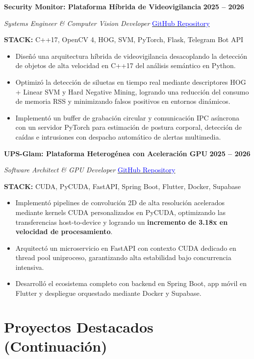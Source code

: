 \documentclass[10pt,a4paper]{article}
\newenvironment{project}[5]{
    \begin{tcolorbox}[
        enhanced,
        colback=cardbg,
        colframe=linecolor,
        boxrule=0.5pt,
        arc=2mm,
        left=3mm,
        right=3mm,
        top=2.5mm,
        bottom=2mm,
        before skip=5pt,
        after skip=5pt,
        breakable
    ]

    {\normalsize\bfseries\color{navy} #1}
    \hfill
    {\small\bfseries\color{blue} #3}

    \vspace{1pt}

    {\small\itshape\color{darktext} #2}
    \hfill
    {\small #4}

    \vspace{3pt}

    {\footnotesize\color{muted}\textbf{STACK:} #5}

    \vspace{2pt}
    \small
    \begin{itemize}
}{
    \end{itemize}
    \end{tcolorbox}
}
\begin{document}
\begin{project}
{Security Monitor: Plataforma Híbrida de Videovigilancia}
{Systems Engineer \& Computer Vision Developer}
{2025 -- 2026}
{\href{https://github.com/David5Uzhca/Security_Monitor_Based_on_Computer_Vision}
{\textcolor{blue}{GitHub Repository}}}
{C++17, OpenCV 4, HOG, SVM, PyTorch, Flask, Telegram Bot API}
    \item Diseñó una arquitectura híbrida de videovigilancia desacoplando la detección de objetos de alta velocidad en C++17 del análisis semántico en Python.
    \item Optimizó la detección de siluetas en tiempo real mediante descriptores HOG + Linear SVM y Hard Negative Mining, logrando una reducción del consumo de memoria RSS y minimizando falsos positivos en entornos dinámicos.
    \item Implementó un buffer de grabación circular y comunicación IPC asíncrona con un servidor PyTorch para estimación de postura corporal, detección de caídas e intrusiones con despacho automático de alertas multimedia.
\end{project}

\begin{project}
{UPS-Glam: Plataforma Heterogénea con Aceleración GPU}
{Software Architect \& GPU Developer}
{2025 -- 2026}
{\href{https://github.com/David5Uzhca/UPS-GLAM}
{\textcolor{blue}{GitHub Repository}}}
{CUDA, PyCUDA, FastAPI, Spring Boot, Flutter, Docker, Supabase}
    \item Implementó pipelines de convolución 2D de alta resolución acelerados mediante kernels CUDA personalizados en PyCUDA, optimizando las transferencias host-to-device y logrando un \textbf{incremento de 3.18x en velocidad de procesamiento}.
    \item Arquitectó un microservicio en FastAPI con contexto CUDA dedicado en thread pool uniproceso, garantizando alta estabilidad bajo concurrencia intensiva.
    \item Desarrolló el ecosistema completo con backend en Spring Boot, app móvil en Flutter y despliegue orquestado mediante Docker y Supabase.
\end{project}

\section{Proyectos Destacados (Continuación)}
\end{document}
